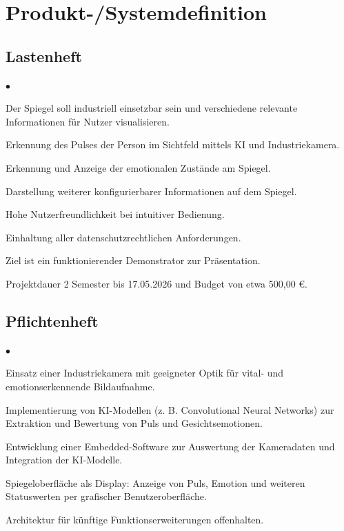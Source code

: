 
\chapter{Produkt-/Systemdefinition}
\section{Lastenheft}
\begin{list}{$\bullet$}{\setlength{\itemsep}{5pt}}
\item Der Spiegel soll industriell einsetzbar sein und verschiedene relevante Informationen für Nutzer visualisieren.

\item Erkennung des Pulses der Person im Sichtfeld mittels KI und Industriekamera.

\item Erkennung und Anzeige der emotionalen Zustände am Spiegel.

\item Darstellung weiterer konfigurierbarer Informationen auf dem Spiegel.

\item Hohe Nutzerfreundlichkeit bei intuitiver Bedienung.

\item Einhaltung aller datenschutzrechtlichen Anforderungen.

\item Ziel ist ein funktionierender Demonstrator zur Präsentation.

\item Projektdauer 2 Semester bis 17.05.2026 und Budget von etwa 500,00 €.
\end{list}
\section{Pflichtenheft}
\begin{list}{$\bullet$}{\setlength{\itemsep}{5pt}}
\item Einsatz einer Industriekamera mit geeigneter Optik für vital- und emotionserkennende Bildaufnahme.

\item Implementierung von KI-Modellen (z. B. Convolutional Neural Networks) zur Extraktion und Bewertung von Puls und Gesichtsemotionen.

\item Entwicklung einer Embedded-Software zur Auswertung der Kameradaten und Integration der KI-Modelle.

\item Spiegeloberfläche als Display: Anzeige von Puls, Emotion und weiteren Statuswerten per grafischer Benutzeroberfläche.

\item Architektur für künftige Funktionserweiterungen offenhalten.
\end{list}